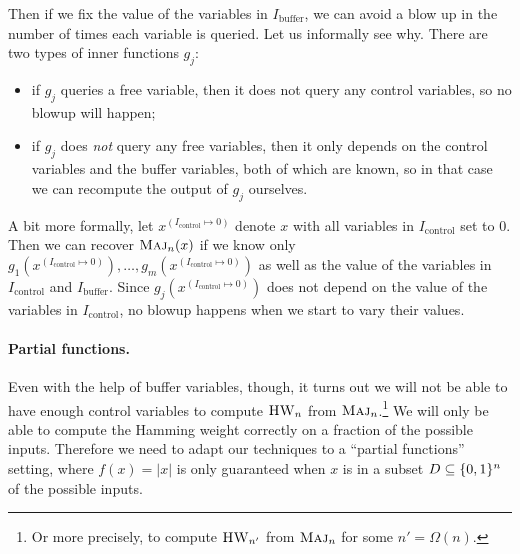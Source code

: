 \documentclass[10pt,a4paper]{article}
\theoremstyle{definition}
\theoremstyle{remark}
\newcommand{\mathsc}[1]{{\normalfont\textsc{#1}}}
\DeclarePairedDelimiter{\set}{\{}{\}}
\DeclareMathOperator{\Maj}{\mathsc{Maj}}
\DeclareMathOperator{\HW}{\mathsc{HW}}
\newcommand{\zo}{\set{0,1}}
\newcommand{\Icontrol}{I_{\mathrm{control}}}
\newcommand{\Ibuffer}{I_{\mathrm{buffer}}}
\begin{document}

Then if we fix the value of the variables in $\Ibuffer$, we can avoid a blow up in the number of times each variable is queried.
Let us informally see why.
There are two types of inner functions $g_j$:
\begin{itemize}
    \item if $g_j$ queries a free variable, then it does not query any control variables, so no blowup will happen;
    \item if $g_j$ does \emph{not} query any free variables, then it only depends on the control variables and the buffer variables, both of which are known, so in that case we can recompute the output of $g_j$ ourselves.
\end{itemize}
A bit more formally, let $x^{(\Icontrol \mapsto 0)}$ denote $x$ with all variables in $\Icontrol$ set to $0$.
Then we can recover $\Maj_n(x)$ if we know only $g_1(x^{(\Icontrol \mapsto 0)}), \ldots, g_m(x^{(\Icontrol \mapsto 0)})$ as well as the value of the variables in $\Icontrol$ and $\Ibuffer$.
Since $g_j(x^{(\Icontrol \mapsto 0)})$ does not depend on the value of the variables in $\Icontrol$, no blowup happens when we start to vary their values.

\paragraph*{Partial functions.}
Even with the help of buffer variables, though, it turns out we will not be able to have enough control variables to compute $\HW_n$ from $\Maj_n$.\footnote{Or more precisely, to compute $\HW_{n'}$ from $\Maj_n$ for some $n' = \Omega(n)$.}
We will only be able to compute the Hamming weight correctly on a fraction of the possible inputs.
Therefore we need to adapt our techniques  to a ``partial functions'' setting, where $f(x) = |x|$ is only guaranteed when $x$ is in a subset $D \subseteq \zo^n$ of the possible inputs.
\end{document}
